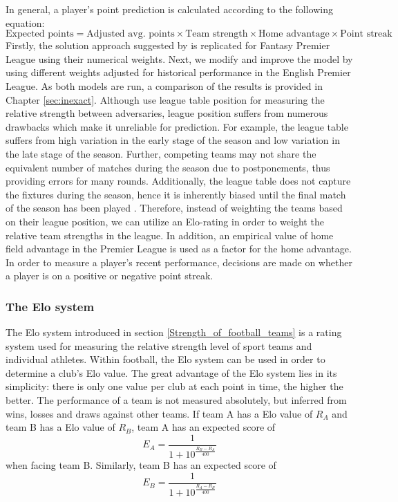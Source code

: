 In general, a player's point prediction is calculated according to the following equation:
\begin{equation}
    \textrm{Expected points} = \textrm{Adjusted avg. points} \times \textrm{Team strength} \times \textrm{Home advantage} \times \textrm{Point streak}
\end{equation}
\newpar
Firstly, the solution approach suggested by \cite{Bonomo} is replicated for Fantasy Premier League using their numerical weights. Next, we modify and improve the model by using different weights adjusted for historical performance in the English Premier League. As both models are run, a comparison of the results is provided in Chapter \ref{sec:inexact}. 
\newpar
Although \cite{Bonomo} use league table position for measuring the relative strength between adversaries, league position suffers from numerous drawbacks which make it unreliable for prediction. For example, the league table suffers from high variation in the early stage of the season and low variation in the late stage of the season. Further, competing teams may not share the equivalent number of matches during the season due to postponements, thus providing errors for many rounds. Additionally, the league table does not capture the fixtures during the season, hence it is inherently biased until the final match of the season has been played \citep{Constantinou}. Therefore, instead of weighting the teams based on their league position, we can utilize an Elo-rating in order to weight the relative team strengths in the league. In addition, an empirical value of home field advantage in the Premier League is used as a factor for the home advantage. In order to measure a player's recent performance, decisions are made on whether a player is on a positive or negative point streak.

\subsubsection{The Elo system}

The Elo system introduced in section \ref{Strength_of_football_teams} is a rating system used for measuring the relative strength level of sport teams and individual athletes. Within football, the Elo system can be used in order to determine a club's Elo value. The great advantage of the Elo system lies in its simplicity: there is only one value per club at each point in time, the higher the better. 
\newpar
The performance of a team is not measured absolutely, but inferred from wins, losses and draws against other teams. If team A has a Elo value of $R_A$ and team B has a Elo value of $R_B$, team A has an expected score of 
\begin{equation}\label{eq5.2}
    E_A = \frac{1}{1+10^{\frac{R_B - R_A}{400}}}
\end{equation}
when facing team B. Similarly, team B has an expected score of
\begin{equation}\label{eq5.3}
    E_B = \frac{1}{1+10^{\frac{R_A - R_B}{400}}}
\end{equation}

